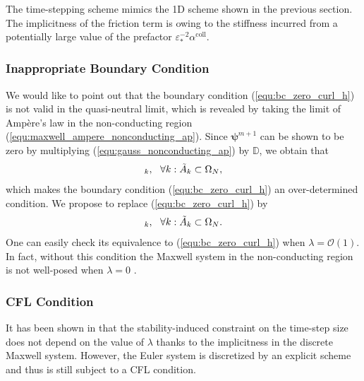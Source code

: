 \documentclass{article}
\begin{document}
The time-stepping scheme mimics the 1D scheme shown in the previous section. The implicitness of the friction term is owing to the stiffness incurred from a potentially large value of the prefactor $\varepsilon^{-2}_*\alpha^\text{coll}$.

\subsubsection{Inappropriate Boundary Condition} \label{sec:inapp_bc}
We would like to point out that the boundary condition (\ref{equ:bc_zero_curl_h}) is not valid in the quasi-neutral limit, which is revealed by taking the limit of Amp\`{e}re's law in the non-conducting region (\ref{equ:maxwell_ampere_nonconducting_ap}). Since $\bm{\psi}^{m+1}$ can be shown to be zero by multiplying (\ref{equ:gauss_nonconducting_ap}) by $\mathbb{D}$, we obtain that
\begin{equation*}
    [\Tilde{\mathbb{C}}\mathbf{h}^{m+1} = 0]_k, \ \ \forall k : \Tilde{A}_k \subset \Omega_N,
\end{equation*}
which makes the boundary condition (\ref{equ:bc_zero_curl_h}) an over-determined condition. We propose to replace (\ref{equ:bc_zero_curl_h}) by 
\begin{equation*}
    [\mathbf{d}^{m+1} = 0]_k, \ \ \forall k : \Tilde{A}_k \subset \Omega_N.
\end{equation*}
One can easily check its equivalence to (\ref{equ:bc_zero_curl_h}) when $\lambda = \mathcal{O}(1)$. In fact, without this condition the Maxwell system in the non-conducting region is not well-posed when $\lambda = 0$ \cite{alfredo_2003}. 

\subsubsection{CFL Condition}
It has been shown in \cite{degond_2012} that the stability-induced constraint on the time-step size does not depend on the value of $\lambda$ thanks to the implicitness in the discrete Maxwell system. However, the Euler system is discretized by an explicit scheme and thus is still subject to a CFL condition.
\end{document}
